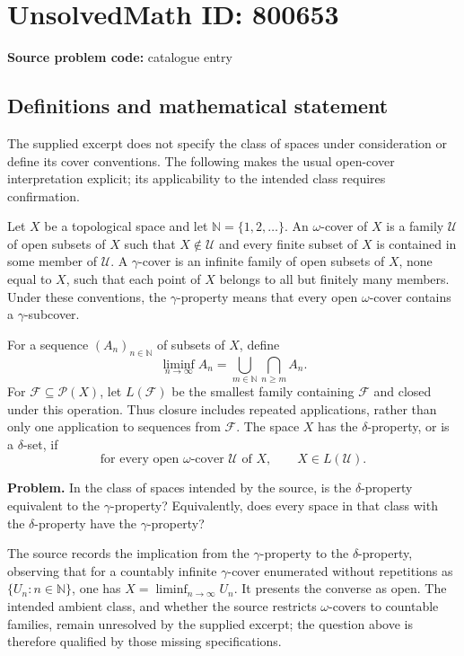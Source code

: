 \documentclass[11pt]{article}
\newcommand{\N}{\mathbb{N}}
\begin{document}
\section*{UnsolvedMath ID: 800653}
\textbf{Source problem code:} catalogue entry
\subsection{Definitions and mathematical statement}
The supplied excerpt does not specify the class of spaces under consideration or define its cover conventions. The following makes the usual open-cover interpretation explicit; its applicability to the intended class requires confirmation.

Let \(X\) be a topological space and let \(\N=\{1,2,\ldots\}\). An \(\omega\)-cover of \(X\) is a family \(\mathcal U\) of open subsets of \(X\) such that \(X\notin\mathcal U\) and every finite subset of \(X\) is contained in some member of \(\mathcal U\). A \(\gamma\)-cover is an infinite family of open subsets of \(X\), none equal to \(X\), such that each point of \(X\) belongs to all but finitely many members. Under these conventions, the \(\gamma\)-property means that every open \(\omega\)-cover contains a \(\gamma\)-subcover.

For a sequence \((A_n)_{n\in\N}\) of subsets of \(X\), define
\[
\liminf_{n\to\infty} A_n
=\bigcup_{m\in\N}\bigcap_{n\ge m}A_n.
\]
For \(\mathcal F\subseteq\mathcal P(X)\), let \(L(\mathcal F)\) be the smallest family containing \(\mathcal F\) and closed under this operation. Thus closure includes repeated applications, rather than only one application to sequences from \(\mathcal F\). The space \(X\) has the \(\delta\)-property, or is a \(\delta\)-set, if
\[
\text{for every open }\omega\text{-cover }\mathcal U\text{ of }X,
\qquad X\in L(\mathcal U).
\]

\textbf{Problem.} In the class of spaces intended by the source, is the \(\delta\)-property equivalent to the \(\gamma\)-property? Equivalently, does every space in that class with the \(\delta\)-property have the \(\gamma\)-property?

The source records the implication from the \(\gamma\)-property to the \(\delta\)-property, observing that for a countably infinite \(\gamma\)-cover enumerated without repetitions as \(\{U_n:n\in\N\}\), one has \(X=\liminf_{n\to\infty}U_n\). It presents the converse as open. The intended ambient class, and whether the source restricts \(\omega\)-covers to countable families, remain unresolved by the supplied excerpt; the question above is therefore qualified by those missing specifications.
\end{document}
